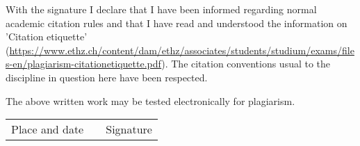 \vspace{1cm}

With the signature I declare that I have been informed regarding normal academic citation rules and that I have read and understood the information on 'Citation etiquette' (\url{https://www.ethz.ch/content/dam/ethz/associates/students/studium/exams/files-en/plagiarism-citationetiquette.pdf}). The citation conventions usual to the discipline in question here have been respected.

\vspace{0.5cm}

The above written work may be tested electronically for plagiarism.

\vspace{4cm}

\begin{tabular}{ p{5cm} p{1cm} p{5cm} }
  \cline{1-1} \cline{3-3}
  Place and date & & Signature \\
\end{tabular}